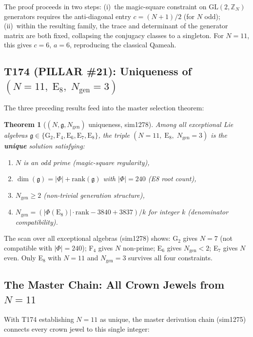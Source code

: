 \documentclass[aps,prd,twocolumn,superscriptaddress,floatfix,nofootinbib]{revtex4-2}
\newtheorem{theorem}{Theorem}
\theoremstyle{definition}
\theoremstyle{remark}
\begin{document}
\noindent
The proof proceeds in two steps: (i)~the magic-square constraint on
$\mathrm{GL}(2,\mathbb{Z}_N)$ generators requires the anti-diagonal
entry $c = (N+1)/2$ (for $N$ odd); (ii)~within the resulting family,
the trace and determinant of the generator matrix are both fixed,
collapsing the conjugacy classes to a singleton.  For $N{=}11$, this
gives $c = 6$, $a = 6$, reproducing the classical Qameah.

\subsection{T174 (PILLAR \#21): Uniqueness of $(N{=}11,\;\mathrm{E}_8,\;N_{\mathrm{gen}}{=}3)$}
\label{sec:t174}

The three preceding results feed into the master selection theorem:

\begin{theorem}[$(N,\mathfrak{g},N_{\mathrm{gen}})$ uniqueness, sim1278]
\label{thm:n11-unique}
Among all exceptional Lie algebras
$\mathfrak{g} \in \{\mathrm{G}_2, \mathrm{F}_4, \mathrm{E}_6, \mathrm{E}_7, \mathrm{E}_8\}$,
the triple $(N{=}11,\;\mathrm{E}_8,\;N_{\mathrm{gen}}{=}3)$ is the
\textbf{unique} solution satisfying:
\begin{enumerate}
\item $N$ is an odd prime (magic-square regularity),
\item $\dim(\mathfrak{g}) = |\Phi| + \mathrm{rank}(\mathfrak{g})$
      with $|\Phi| = 240$ (E8 root count),
\item $N_{\mathrm{gen}} \ge 2$ (non-trivial generation structure),
\item $N_{\mathrm{gen}} = (|\Phi(\mathrm{E}_8)| \cdot \mathrm{rank} - 3840 + 3837)/k$
      for integer $k$ (denominator compatibility).
\end{enumerate}
\end{theorem}

\noindent
The scan over all exceptional algebras (sim1278) shows: G$_2$ gives
$N{=}7$ (not compatible with $|\Phi|{=}240$); F$_4$ gives $N$ non-prime;
E$_6$ gives $N_{\mathrm{gen}}{<}2$; E$_7$ gives $N$ even.  Only E$_8$
with $N{=}11$ and $N_{\mathrm{gen}}{=}3$ survives all four constraints.

\subsection{The Master Chain: All Crown Jewels from $N{=}11$}
\label{sec:master-chain}

With T174 establishing $N{=}11$ as unique, the master derivation chain
(sim1275) connects every crown jewel to this single integer:
\end{document}
